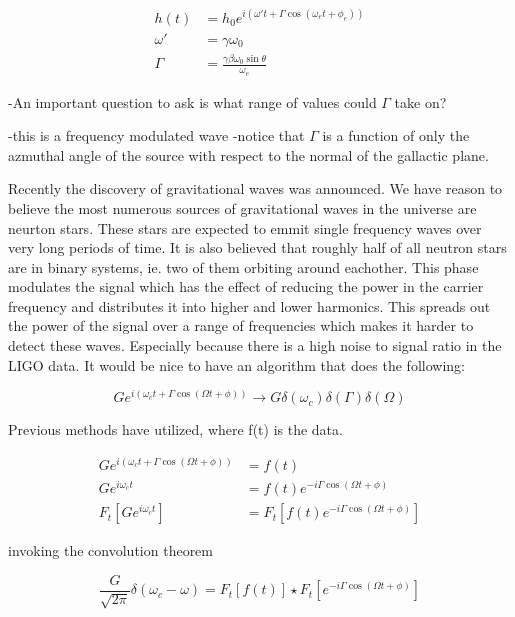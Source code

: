\documentclass[twocolumn, groupedaddress]{revtex4-1}
\begin{document}
\begin{align}
h(t)    &= h_0 e^{i \left( \omega' t + \Gamma \cos (\omega_e t + \phi_e) \right)}	\\
\omega' &= \gamma \omega_0															\\
\Gamma  &= \frac{\gamma \beta \omega_0 \sin \theta}{\omega_e}
\end{align}

-An important question to ask is what range of values could $\Gamma$ take on?

-this is a frequency modulated wave
-notice that $\Gamma$ is a function of only the azmuthal angle of the source with respect to the normal of the gallactic plane.

Recently the discovery of gravitational waves was announced.  We have reason to believe the most numerous sources of gravitational waves in the universe are neurton stars.  These stars are expected to emmit single frequency waves over very long periods of time.  It is also believed that roughly half of all neutron stars are in binary systems, ie. two of them orbiting around eachother.  This phase modulates the signal which has the effect of reducing the power in the carrier frequency and distributes it into higher and lower harmonics.  This spreads out the power of the signal over a range of frequencies which makes it harder to detect these waves.  Especially because there is a high noise to signal ratio in the LIGO data.  It would be nice to have an algorithm that does the following:

\begin{equation}
G e^{i\left( \omega_c t + \Gamma \cos (\Omega t + \phi ) \right)} \to G \delta (\omega_c) \delta (\Gamma ) \delta (\Omega )
\end{equation}

Previous methods have utilized, where f(t) is the data.

\begin{align}
G e^{i\left( \omega_c t + \Gamma \cos (\Omega t + \phi ) \right)} &= f(t) \\
G e^{i\omega_c t} &= f(t) e^{-i\Gamma \cos (\Omega t + \phi)}			 \\
F_t \left[ G e^{i\omega_c t} \right] &= F_t \left[ f(t) e^{-i\Gamma \cos (\Omega t + \phi)} \right]
\end{align}

invoking the convolution theorem

\begin{equation}
\frac{G}{\sqrt{2\pi}} \delta (\omega_c - \omega) = F_t \left[ f(t) \right] \star F_t \left[ e^{-i\Gamma \cos (\Omega t + \phi)} \right]
\end{equation}
\end{document}
